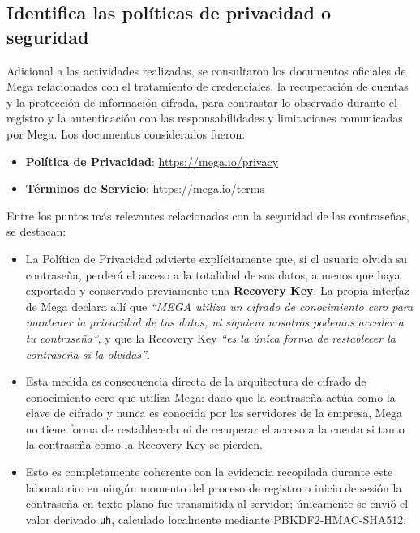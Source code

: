 \documentclass[letter,12pt]{article}
\newcommand{\sangria}{\hspace*{1.25cm}} %
\begin{document}
\subsection{Identifica las políticas de privacidad o seguridad}

\sangria Adicional a las actividades realizadas, se consultaron los documentos oficiales de Mega relacionados con el tratamiento de credenciales, la recuperación de cuentas y la protección de información cifrada, para contrastar lo observado durante el registro y la autenticación con las responsabilidades y limitaciones comunicadas por Mega. Los documentos considerados fueron:

\begin{itemize}
    \item \textbf{Política de Privacidad}: \url{https://mega.io/privacy}
    \item \textbf{Términos de Servicio}: \url{https://mega.io/terms}
\end{itemize}

Entre los puntos más relevantes relacionados con la seguridad de las contraseñas, se destacan:

\begin{itemize}
    \item La Política de Privacidad advierte explícitamente que, si el usuario olvida su contraseña, perderá el acceso a la totalidad de sus datos, a menos que haya exportado y conservado previamente una \textbf{Recovery Key}. La propia interfaz de Mega declara allí que \textit{``MEGA utiliza un cifrado de conocimiento cero para mantener la privacidad de tus datos, ni siquiera nosotros podemos acceder a tu contraseña''}, y que la Recovery Key \textit{``es la única forma de restablecer la contraseña si la olvidas''}.

    \item Esta medida es consecuencia directa de la arquitectura de cifrado de conocimiento cero que utiliza Mega: dado que la contraseña actúa como la clave de cifrado y nunca es conocida por los servidores de la empresa, Mega no tiene forma de restablecerla ni de recuperar el acceso a la cuenta si tanto la contraseña como la Recovery Key se pierden.

    \item Esto es completamente coherente con la evidencia recopilada durante este laboratorio: en ningún momento del proceso de registro o inicio de sesión la contraseña en texto plano fue transmitida al servidor; únicamente se envió el valor derivado \texttt{uh}, calculado localmente mediante PBKDF2-HMAC-SHA512.
\end{itemize}
\end{document}

